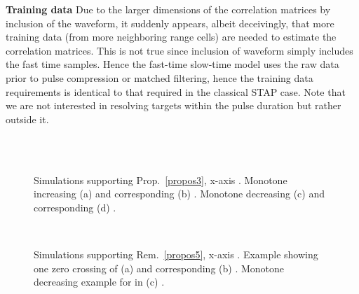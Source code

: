 \documentclass[11pt,draftclsnofoot,onecolumn]{IEEEtran}
\theoremstyle{definition}
\theoremstyle{remark}
\begin{document}
{\bf Training data} Due to the larger dimensions of the correlation matrices by inclusion of the waveform, it suddenly appears, albeit deceivingly, that more training data (from more neighboring range cells) are needed to estimate the correlation matrices. This is not true since inclusion of waveform simply includes the fast time samples. Hence the fast-time slow-time model uses the raw data prior to pulse compression or matched filtering, hence the training data requirements is identical to that required in the classical STAP case. Note that we are not interested in resolving targets within the pulse duration but rather outside it.




\begin{figure*}[htbp!]
\centering
   \\
   \\
\caption{ Simulations supporting Prop.~\ref{propos3}, x-axis . Monotone increasing (a)  and corresponding (b) . Monotone decreasing (c)  and corresponding (d) .}
\label{lagrasupport1}
\end{figure*}

\begin{figure*}[htbp!]
\centering
   \\
\caption{ Simulations supporting Rem.~\ref{propos5}, x-axis . Example showing one zero crossing of (a)  and corresponding (b) . Monotone decreasing example for  in (c) .}
\label{lagrasupport2}
\end{figure*}
\end{document}
